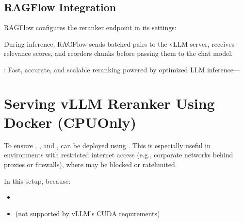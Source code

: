 \documentclass[letterpaper,10pt,english]{sphinxmanual}
\begin{document}
\section{RAGFlow Integration}
\label{\detokenize{vllm:ragflow-integration}}
\sphinxAtStartPar
RAGFlow configures the reranker endpoint in its settings:

\begin{sphinxVerbatim}[commandchars=\\\{\}]
\end{sphinxVerbatim}

\sphinxAtStartPar
During inference, RAGFlow sends batched  pairs to the vLLM server, receives relevance scores, and reorders chunks before passing them to the chat model.

\sphinxAtStartPar
{}: Fast, accurate, and scalable reranking powered by optimized LLM inference—

\sphinxstepscope


\chapter{Serving vLLM Reranker Using Docker (CPU\sphinxhyphen{}Only)}
\label{\detokenize{vllm-cpu:serving-vllm-reranker-using-docker-cpu-only}}\label{\detokenize{vllm-cpu:vllm-docker}}\label{\detokenize{vllm-cpu::doc}}
\sphinxAtStartPar
To ensure , , and ,  can be deployed using . This is especially useful in environments with restricted internet access (e.g., corporate networks behind proxies or firewalls), where  may be blocked or rate\sphinxhyphen{}limited.

\sphinxAtStartPar
In this setup,  because:
\begin{itemize}
\item {} 
\sphinxAtStartPar
{}

\item {} 
\sphinxAtStartPar
{} (not supported by vLLM’s CUDA requirements)

\end{itemize}
\end{document}
